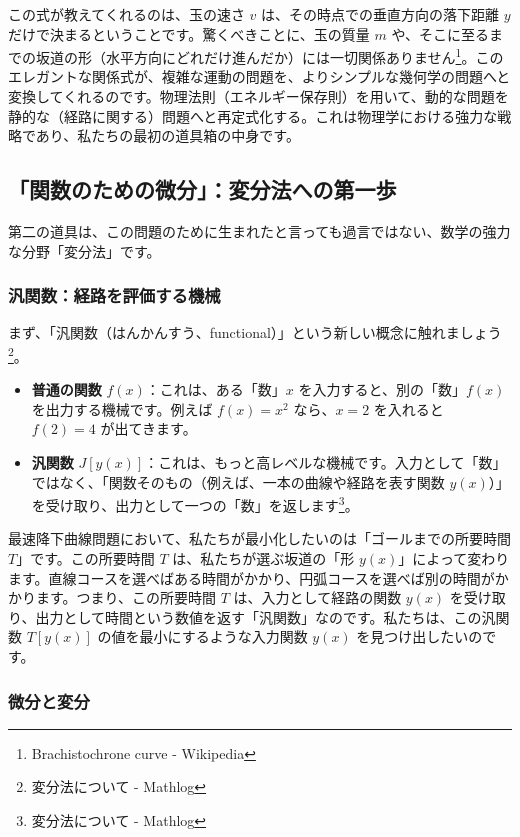 \documentclass[a4paper,12pt]{bxjsarticle}
\begin{document}
この式が教えてくれるのは、玉の速さ $v$ は、その時点での垂直方向の落下距離 $y$ だけで決まるということです。驚くべきことに、玉の質量 $m$ や、そこに至るまでの坂道の形（水平方向にどれだけ進んだか）には一切関係ありません\footnote{Brachistochrone curve - Wikipedia}。このエレガントな関係式が、複雑な運動の問題を、よりシンプルな幾何学の問題へと変換してくれるのです。物理法則（エネルギー保存則）を用いて、動的な問題を静的な（経路に関する）問題へと再定式化する。これは物理学における強力な戦略であり、私たちの最初の道具箱の中身です。

\subsection{「関数のための微分」：変分法への第一歩}

第二の道具は、この問題のために生まれたと言っても過言ではない、数学の強力な分野「変分法」です。

\subsubsection{汎関数：経路を評価する機械}

まず、「汎関数（はんかんすう、functional）」という新しい概念に触れましょう\footnote{変分法について - Mathlog}。

\begin{itemize}
\item \textbf{普通の関数} $f(x)$：これは、ある「数」$x$ を入力すると、別の「数」$f(x)$ を出力する機械です。例えば $f(x)=x^2$ なら、$x=2$ を入れると $f(2)=4$ が出てきます。

\item \textbf{汎関数} $J[y(x)]$：これは、もっと高レベルな機械です。入力として「数」ではなく、「関数そのもの（例えば、一本の曲線や経路を表す関数 $y(x)$）」を受け取り、出力として一つの「数」を返します\footnote{変分法について - Mathlog}。
\end{itemize}

最速降下曲線問題において、私たちが最小化したいのは「ゴールまでの所要時間 $T$」です。この所要時間 $T$ は、私たちが選ぶ坂道の「形 $y(x)$」によって変わります。直線コースを選べばある時間がかかり、円弧コースを選べば別の時間がかかります。つまり、この所要時間 $T$ は、入力として経路の関数 $y(x)$ を受け取り、出力として時間という数値を返す「汎関数」なのです。私たちは、この汎関数 $T[y(x)]$ の値を最小にするような入力関数 $y(x)$ を見つけ出したいのです。

\subsubsection{微分と変分}
\end{document}
